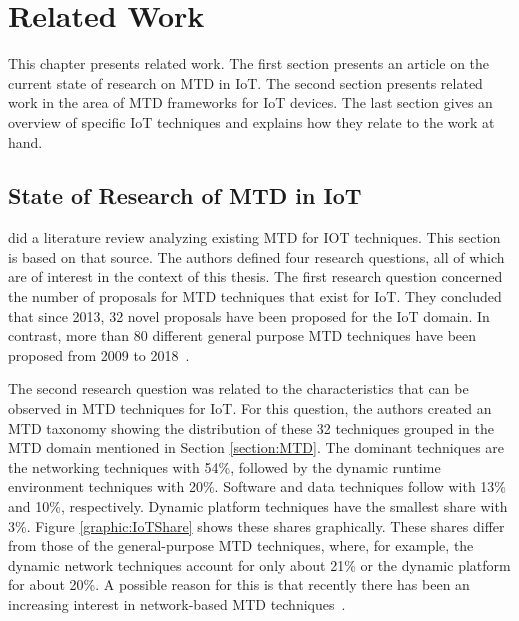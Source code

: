 \chapter{Related Work}
This chapter presents related work. The first section presents an article on the current state of research on MTD in IoT. The second section presents related work in the area of MTD frameworks for IoT devices. The last section gives an overview of specific IoT techniques and explains how they relate to the work at hand. 

\section{State of Research of MTD in IoT}
\cite{navas:2021MTDWhere} did a literature review analyzing existing MTD for IOT techniques. This section is based on that source. The authors defined four research questions, all of which are of interest in the context of this thesis. The first research question concerned the number of proposals for MTD techniques that exist for IoT. They concluded that since 2013, 32 novel proposals have been proposed for the IoT domain. In contrast, more than 80 different general purpose MTD techniques have been proposed from 2009 to 2018~\cite{website:surveyOfCyberMovingTargets}. 

The second research question was related to the characteristics that can be observed in MTD techniques for IoT. For this question, the authors created an MTD taxonomy showing the distribution of these 32 techniques grouped in the MTD domain mentioned in Section \ref{section:MTD}. The dominant techniques are the networking techniques with 54\%, followed by the dynamic runtime environment techniques with 20\%. Software and data techniques follow with 13\% and 10\%, respectively. Dynamic platform techniques have the smallest share with 3\%. Figure \ref{graphic:IoTShare} shows these shares graphically. These shares differ from those of the general-purpose MTD techniques, where, for example, the dynamic network techniques account for only about 21\% or the dynamic platform for about 20\%. A possible reason for this is that recently there has been an increasing interest in network-based MTD techniques~\cite{navas:2021MTDWhere}. 
 
